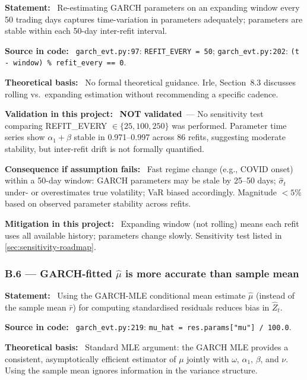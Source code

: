 \documentclass[11pt,a4paper]{article}
\newcommand{\asmfield}[1]{\medskip\noindent\textbf{#1:}\ }
\newcommand{\code}[1]{\texttt{#1}}
\newcommand{\notvalidated}{\textbf{NOT validated}}
\begin{document}
\asmfield{Statement}
Re-estimating GARCH parameters on an expanding window every 50 trading
days captures time-variation in parameters adequately; parameters are
stable within each 50-day inter-refit interval.

\asmfield{Source in code}
\code{garch\_evt.py:97}: \lstinline|REFIT_EVERY = 50|;
\code{garch\_evt.py:202}: \lstinline|(t - window) % refit_every == 0|.

\asmfield{Theoretical basis}
No formal theoretical guidance. Irle, Section~8.3 discusses rolling vs.\
expanding estimation without recommending a specific cadence.

\asmfield{Validation in this project}
\notvalidated\ --- No sensitivity test comparing REFIT\_EVERY $\in
\{25, 100, 250\}$ was performed. Parameter time series show $\alpha_1 +
\beta$ stable in 0.971--0.997 across 86 refits, suggesting moderate
stability, but inter-refit drift is not formally quantified.

\asmfield{Consequence if assumption fails}
Fast regime change (e.g., COVID onset) within a 50-day window: GARCH
parameters may be stale by 25--50 days; $\hat{\sigma}_t$ under- or
overestimates true volatility; VaR biased accordingly. Magnitude $< 5\%$
based on observed parameter stability across refits.

\asmfield{Mitigation in this project}
Expanding window (not rolling) means each refit uses all available history;
parameters change slowly. Sensitivity test listed in
\cref{sec:sensitivity-roadmap}.

\subsubsection{B.6 --- GARCH-fitted $\hat{\mu}$ is more accurate than sample mean}\label{asm:B6}

\asmfield{Statement}
Using the GARCH-MLE conditional mean estimate $\hat{\mu}$ (instead of the
sample mean $\bar{r}$) for computing standardised residuals reduces bias
in $\hat{Z}_t$.

\asmfield{Source in code}
\code{garch\_evt.py:219}: \lstinline|mu_hat = res.params["mu"] / 100.0|.

\asmfield{Theoretical basis}
Standard MLE argument: the GARCH MLE provides a consistent, asymptotically
efficient estimator of $\mu$ jointly with $\omega$, $\alpha_1$, $\beta$,
and $\nu$. Using the sample mean ignores information in the variance
structure.
\end{document}
